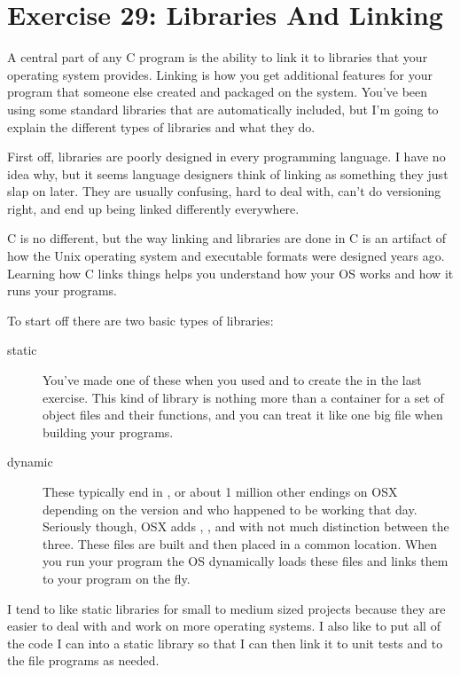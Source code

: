 \chapter{Exercise 29: Libraries And Linking}

A central part of any C program is the ability to link it to libraries that
your operating system provides.  Linking is how you get additional features
for your program that someone else created and packaged on the system.  You've
been using some standard libraries that are automatically included, but I'm
going to explain the different types of libraries and what they do.

First off, libraries are poorly designed in every programming language.  I have 
no idea why, but it seems language designers think of linking as something they
just slap on later.  They are usually confusing, hard to deal with, can't do
versioning right, and end up being linked differently everywhere.

C is no different, but the way linking and libraries are done in C is an artifact
of how the Unix operating system and executable formats were designed years ago.
Learning how C links things helps you understand how your OS works and how it
runs your programs.

To start off there are two basic types of libraries:

\begin{description}
\item[static] You've made one of these when you used  and 
    to create the  in the last exercise.  This kind of library
    is nothing more than a container for a set of  object files and their
    functions, and you can treat it like one big  file when building 
    your programs.
\item[dynamic] These typically end in ,  or about 1 million other
    endings on OSX depending on the version and who happened to be working that day.
    Seriously though, OSX adds , , and  with not much distinction between the three. These files are built and then placed
    in a common location.  When you run your program the OS dynamically loads these
    files and links them to your program on the fly.
\end{description}

I tend to like static libraries for small to medium sized projects because they are
easier to deal with and work on more operating systems.  I also like to put all of the
code I can into a static library so that I can then link it to unit tests and to the
file programs as needed.


